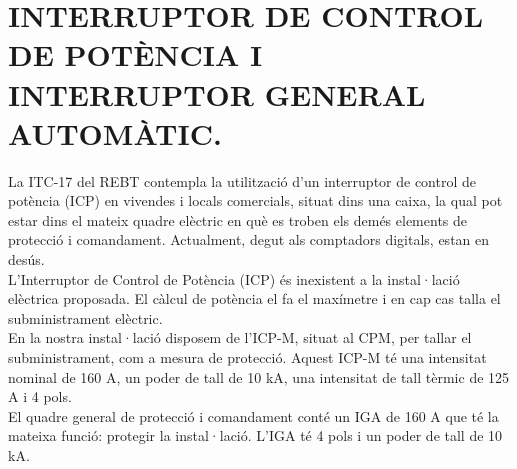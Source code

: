 \chapter{\uppercase{Interruptor de control de potència i interruptor general automàtic.}}
La ITC-17 del REBT contempla la utilització d'un interruptor de control de potència (ICP) en vivendes i locals comercials, situat dins una caixa, la qual pot estar dins el mateix quadre elèctric en què es troben els demés elements de protecció i comandament. Actualment, degut als comptadors digitals, estan en desús.\\
\newline L'Interruptor de Control de Potència (ICP) és inexistent a la instal·lació elèctrica proposada. El càlcul de potència el fa el maxímetre i en cap cas talla el subministrament elèctric.\\
\newline En la nostra instal·lació disposem de l'ICP-M, situat al CPM, per tallar el subministrament, com a mesura de protecció. Aquest ICP-M té una intensitat nominal de 160 A, un poder de tall de 10 kA, una intensitat de tall tèrmic de 125 A i 4 pols.\\
\newline El quadre general de protecció i comandament conté un IGA de 160 A que té la mateixa funció: protegir la instal·lació. L'IGA té 4 pols i un poder de tall de 10 kA.

\clearpage